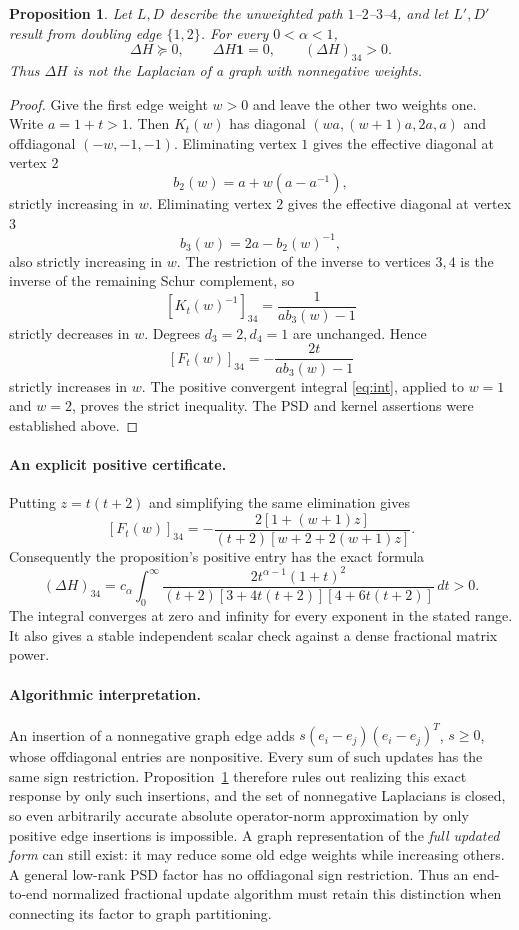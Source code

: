\documentclass[11pt]{article}
\newtheorem{proposition}{Proposition}
\begin{document}
\begin{proposition}\label{prop:main}
Let $L,D$ describe the unweighted path $1$--$2$--$3$--$4$, and let
$L',D'$ result from doubling edge $\{1,2\}$. For every $0<\alpha<1$,
\[
 \Delta H\succeq0,\qquad \Delta H\mathbf1=0,
 \qquad (\Delta H)_{34}>0.
\]
Thus $\Delta H$ is not the Laplacian of a graph with nonnegative weights.
\end{proposition}
\begin{proof}
Give the first edge weight $w>0$ and leave the other two weights one.
Write $a=1+t>1$. Then $K_t(w)$ has diagonal
$(wa,(w+1)a,2a,a)$ and offdiagonal $(-w,-1,-1)$.
Eliminating vertex $1$ gives the effective diagonal at vertex $2$
\[
 b_2(w)=a+w(a-a^{-1}),
\]
strictly increasing in $w$. Eliminating vertex $2$ gives the effective
diagonal at vertex $3$
\[
 b_3(w)=2a-b_2(w)^{-1},
\]
also strictly increasing in $w$. The restriction of the inverse to
vertices $3,4$ is the inverse of the remaining Schur complement, so
\[
 [K_t(w)^{-1}]_{34}=\frac1{a b_3(w)-1}
\]
strictly decreases in $w$. Degrees $d_3=2,d_4=1$ are unchanged. Hence
\[
 [F_t(w)]_{34}=-\frac{2t}{a b_3(w)-1}
\]
strictly increases in $w$. The positive convergent integral
\eqref{eq:int}, applied to $w=1$ and $w=2$, proves the strict inequality.
The PSD and kernel assertions were established above.
\end{proof}

\paragraph{An explicit positive certificate.}
Putting $z=t(t+2)$ and simplifying the same elimination gives
\[
 [F_t(w)]_{34}=
 -\frac{2[1+(w+1)z]}{(t+2)[w+2+2(w+1)z]}.
\]
Consequently the proposition's positive entry has the exact formula
\begin{equation}\label{eq:cert}
 (\Delta H)_{34}
 =c_\alpha\int_0^\infty
 \frac{2t^{\alpha-1}(1+t)^2}
 {(t+2)[3+4t(t+2)][4+6t(t+2)]}\,dt>0.
\end{equation}
The integral converges at zero and infinity for every exponent in the
stated range. It also gives a stable independent scalar check against a
dense fractional matrix power.

\paragraph{Algorithmic interpretation.}
An insertion of a nonnegative graph edge adds
$s(e_i-e_j)(e_i-e_j)^T$, $s\ge0$, whose offdiagonal entries are
nonpositive. Every sum of such updates has the same sign restriction.
Proposition~\ref{prop:main} therefore rules out realizing this exact
response by only such insertions, and the set of nonnegative Laplacians
is closed, so even arbitrarily accurate absolute operator-norm
approximation by only positive edge insertions is impossible.
A graph representation of the \emph{full updated form} can still exist:
it may reduce some old edge weights while increasing others. A general
low-rank PSD factor has no offdiagonal sign restriction. Thus an
end-to-end normalized fractional update algorithm must retain this
distinction when connecting its factor to graph partitioning.
\end{document}
